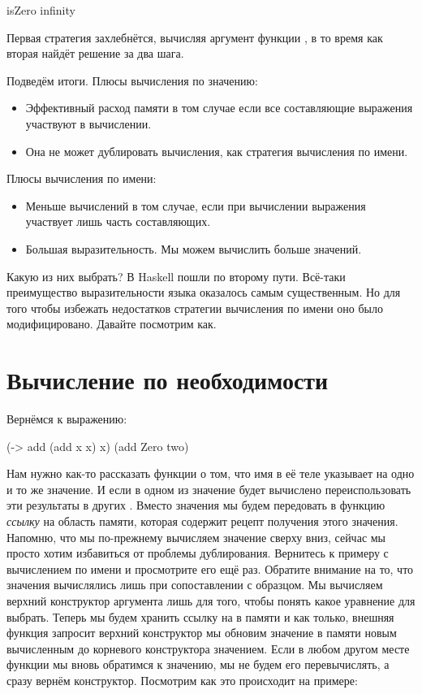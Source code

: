 \begin{code}
isZero infinity
\end{code}

Первая стратегия захлебнётся, вычисляя аргумент функции ,
в то время как вторая найдёт решение за два шага. 

Подведём итоги. Плюсы вычисления по значению:

\begin{itemize}
\item Эффективный расход памяти в том случае если все 
        составляющие выражения участвуют в вычислении.

\item Она не может дублировать вычисления, как стратегия
        вычисления по имени.
\end{itemize}

Плюсы вычисления по имени:

\begin{itemize}
\item Меньше вычислений в том случае, если при вычислении выражения
    участвует лишь часть составляющих.

\item Большая выразительность. Мы можем вычислить больше значений.
\end{itemize}

Какую из них выбрать? В Haskell пошли по второму пути. Всё-таки
преимущество выразительности языка оказалось самым существенным.
Но для того чтобы избежать недостатков стратегии вычисления по имени
оно было модифицировано. Давайте посмотрим как.

\section{Вычисление по необходимости}

Вернёмся к выражению: 

\begin{code}
(\x -> add (add x x) x) (add Zero two)
\end{code}

Нам нужно как-то рассказать функции о том, что имя 
в её теле указывает на одно и то же значение. И если
в одном из  значение будет вычислено переиспользовать
эти результаты в других . Вместо значения мы будем
передовать в функцию \emph{ссылку} на область памяти,
которая содержит рецепт получения этого значения. 
Напомню, что мы по-прежнему вычисляем значение сверху вниз,
сейчас мы просто хотим избавиться от проблемы дублирования.
Вернитесь к примеру с вычислением по имени и просмотрите его
ещё раз. Обратите внимание на то, что значения вычислялись
лишь при сопоставлении с образцом. 
Мы вычисляем верхний конструктор аргумента лишь для того,
чтобы понять какое уравнение для  выбрать. 
Теперь мы будем хранить ссылку на 
в памяти и как только, внешняя функция запросит
верхний конструктор мы обновим значение в памяти новым
вычисленным до корневого конструктора значением.
Если в любом другом месте функции мы вновь обратимся 
к значению, мы не будем его перевычислять, а сразу 
вернём конструктор. Посмотрим как это происходит на примере:

